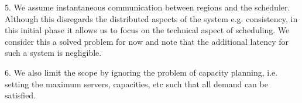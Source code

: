 


5. We assume instantaneous communication between regions and the scheduler. Although this disregards the distributed aspects of the system e.g. consistency, in this initial phase it allows us to focus on the technical aspect of scheduling. We consider this a solved problem for now and note that the additional latency for such a system is negligible. 

6. We also limit the scope by ignoring the problem of capacity planning, i.e. setting the maximum servers, capacities, etc such that all demand can be satisfied.

